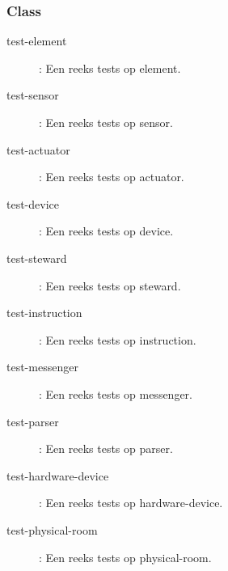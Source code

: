 \documentclass{article}
\begin{document}
\subsubsection{Class}
\begin{description}
	\item[test-element] : Een reeks tests op element.
	\item[test-sensor] : Een reeks tests op sensor.
	\item[test-actuator] : Een reeks tests op actuator.
	\item[test-device] : Een reeks tests op device.
	\item[test-steward] : Een reeks tests op steward.
	\item[test-instruction] : Een reeks tests op instruction.
	\item[test-messenger] : Een reeks tests op messenger.
	\item[test-parser] : Een reeks tests op parser.
	\item[test-hardware-device] : Een reeks tests op hardware-device.
	\item[test-physical-room] : Een reeks tests op physical-room.
\end{description}
\end{document}

